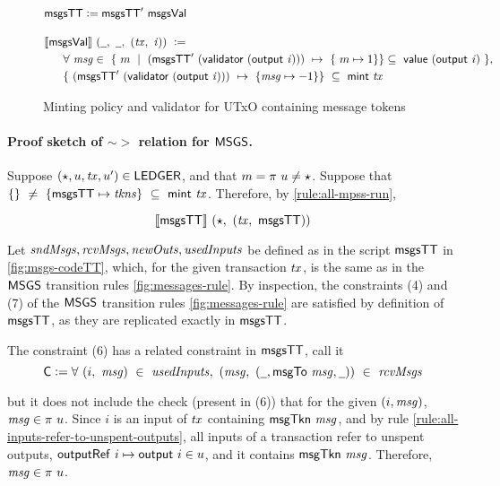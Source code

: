 \begin{figure}
  \begin{align*}
    & \msgsTT \leteq \msgsTT'~\msgsVal
    \nextdef
    &\applyScript{\msgsVal}~(\wcard,~\wcard,~(\var{tx},~\var{i}))~\leteq \\
    &~~~~~\forall~\var{msg} \in~\{~m~\mid~(\msgsTT'~(\validator~(\fun{output}~\var{i})))~ \mapsto ~\{~m \mapsto 1 \} \} \subseteq ~\val~(\fun{output}~\var{i})~\}, \\
    &~~~~~ \{~(\msgsTT'~(\validator~(\fun{output}~\var{i})))~ \mapsto ~\{ \var{msg} \mapsto -1 \} \} ~\subseteq~\fun{mint}~\var{tx}
  \end{align*}
\caption{Minting policy and validator for UTxO containing message tokens}
\label{fig:msgs-codeV}
\end{figure}

\paragraph{Proof sketch of $\sim >$ relation for $\mathsf{MSGS}$. }
\label{pf:sim}

Suppose $(\star, u, \mathit{tx}, u') \in \mathsf{LEDGER}$, and that $m = \pi~u \neq \star$.
Suppose that $\{\} ~\neq~ \{\mathsf{msgsTT} \mapsto \mathit{tkns}\} ~\subseteq~ \mathsf{mint}~\mathit{tx}$.
Therefore, by \ref{rule:all-mpss-run},

\[\llbracket\mathsf{msgsTT}\rrbracket~(\star,~(\mathit{tx},~\mathsf{msgsTT}))\]

Let $\mathit{sndMsgs}, \mathit{rcvMsgs}, \mathit{newOuts}, \mathit{usedInputs}$ be defined as
in the script $\mathsf{msgsTT}$
in \ref{fig:msgs-codeTT}, which, for the given transaction $\mathit{tx}$, is the same as
in the $\mathsf{MSGS}$ transition rules \ref{fig:messages-rule}. By inspection, the constraints
(4) and (7) of the $\mathsf{MSGS}$ transition rules \ref{fig:messages-rule} are satisfied by definition
of $\mathsf{msgsTT}$, as they are replicated exactly in $\mathsf{msgsTT}$.

The constraint (6) has a related constraint in $\mathsf{msgsTT}$, call it
\[ \fun{C} \leteq \forall~(i,~\var{msg})~\in~\var{usedInputs},~(\var{msg},~(\wcard, \fun{msgTo}~\var{msg}, \wcard))~\in~\var{rcvMsgs} \]

but it does not include the check (present in (6)) that for the given $(i, \mathit{msg})$,
$\mathit{msg} \in \pi~u$. Since $i$ is an input of $\mathit{tx}$ containing $\mathsf{msgTkn}~\mathit{msg}$,
and by rule \ref{rule:all-inputs-refer-to-unspent-outputs}, all inputs of a
transaction refer to unspent outputs, $\mathsf{outputRef}~i \mapsto \mathsf{output}~i \in u$,
and it contains $\mathsf{msgTkn}~\mathit{msg}$. Therefore, $\mathit{msg} \in \pi~u$.

